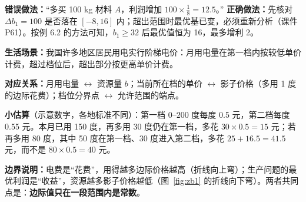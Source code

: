 \begin{warningbox}
\textbf{错误做法：}“多买 100 kg 材料 $A$，利润增加 $100\times\frac18=12.5$。”\quad
\textbf{正确做法：}先核对 $\Delta b_1=100$ 是否落在 $[-8,16]$ 内；超出范围时最优基已变，必须重新分析（课件 P61）。按例 6.2 的方法可知，$b_1\ge32$ 后最优值恒为 16，最多增利 2。
\end{warningbox}

\begin{lifebox}
\begin{minipage}[t]{0.55\linewidth}
\textbf{生活场景：}我国许多地区居民用电实行阶梯电价：月用电量在第一档内按较低单价计费，超过档位后，超出部分按更高单价计费。\par
\textbf{对应关系：}月用电量 $\leftrightarrow$ 资源量 $b$；当前所在档的单价 $\leftrightarrow$ 影子价格（多用 1 度的边际花费）；档位分界点 $\leftrightarrow$ 允许范围的端点。\par
\textbf{小估算}（示意数字，各地标准不同）：第一档 $0$--$200$ 度每度 0.5 元，第二档每度 0.55 元。本月已用 150 度，再多用 30 度仍在第一档，多花 $30\times0.5=15$ 元；若再多用 80 度，其中 50 度在第一档、30 度进入第二档，多花 $25+16.5=41.5$ 元，而不是 $80\times0.5=40$ 元。\par
\textbf{边界说明：}电费是“花费”，用得越多边际价格越高（折线向上弯）；生产问题的最优利润是“收益”，资源越多影子价格越低（图~\ref{fig:zb1} 的折线向下弯）。两者共同点是：\textbf{边际值只在一段范围内是常数}。
\end{minipage}\hfill
\begin{minipage}[t]{0.41\linewidth}\vspace{0pt}\centering
{}
\end{minipage}
\end{lifebox}


